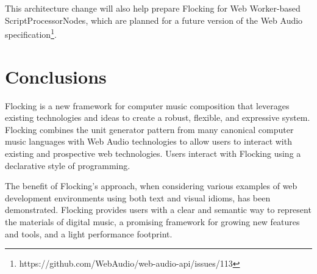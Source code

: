 \documentclass{article}
\begin{document}
This architecture change will also help prepare Flocking for Web Worker-based ScriptProcessorNodes, which are planned for a future version of the Web Audio specification\footnote{https://github.com/WebAudio/web-audio-api/issues/113}.

\section{Conclusions}

Flocking is a new framework for computer music composition that leverages existing technologies and ideas to create a robust, flexible, and expressive system. Flocking combines the unit generator pattern from many canonical computer music languages with Web Audio technologies to allow users to interact with existing and prospective web technologies. Users interact with Flocking using a declarative style of programming.

The benefit of Flocking's approach, when considering various examples of web development environments using both text and visual idioms, has been demonstrated. Flocking provides users with a clear and semantic way to represent the materials of digital music, a promising framework for growing new features and tools, and a light performance footprint.



\end{document}

